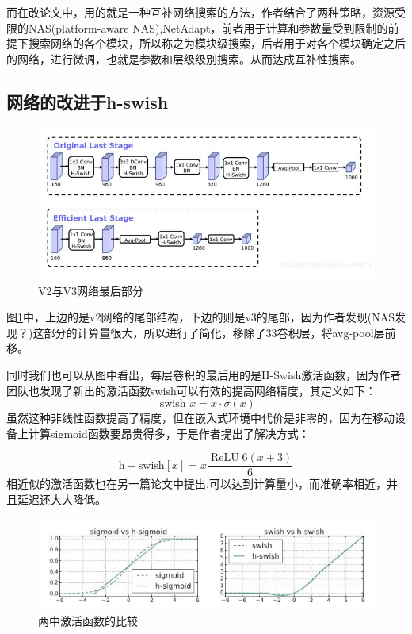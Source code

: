 \documentclass[UTF8,a4paper,12pt]{ctexart}
\begin{document}
而在改论文中，用的就是一种互补网络搜索的方法，作者结合了两种策略，资源受限的NAS(platform-aware NAS)\cite{MnasNet},NetAdapt\cite{NetAdapt}，前者用于计算和参数量受到限制的前提下搜索网络的各个模块，所以称之为模块级搜索，后者用于对各个模块确定之后的网络，进行微调，也就是参数和层级级别搜索。从而达成互补性搜索。


\subsection{网络的改进于h-swish}

\begin{figure}[htbp]
	\centering
	\includegraphics[width=0.5\linewidth]{webmin/网络的改进.jpg}
	\caption{V2与V3网络最后部分}
	\label{fig-bijiaojiegou}
\end{figure}

图\ref{fig-bijiaojiegou}中，上边的是v2网络的尾部结构，下边的则是v3的尾部，因为作者发现(NAS发现？)这部分的计算量很大，所以进行了简化，移除了33卷积层，将avg-pool层前移。

同时我们也可以从图中看出，每层卷积的最后用的是H-Swish激活函数，因为作者团队也发现了新出的激活函数swish\cite{2016Bridging,2018Sigmoid}可以有效的提高网络精度，其定义如下：
\begin{equation}
	\text { swish } x=x \cdot \sigma(x)
		\label{eq-swish}
\end{equation}
虽然这种非线性函数提高了精度，但在嵌入式环境中代价是非零的，因为在移动设备上计算sigmoid函数要昂贵得多，于是作者提出了解决方式：

\begin{equation}
	\mathrm{h}-\mathrm{swish}[x]=x \frac{\operatorname{ReLU} 6(x+3)}{6}
		\label{eq-hswish}
\end{equation}
相近似的激活函数也在另一篇论文中提出\cite{2019hard-swish},可以达到计算量小，而准确率相近，并且延迟还大大降低。


\begin{figure}[htbp]
	\centering
	\includegraphics[width=0.7\linewidth]{webmin/sigmoid_h_sigmoid.jpg}
	\caption{两中激活函数的比较}
	\label{fig-hsish}
\end{figure}
\end{document}
